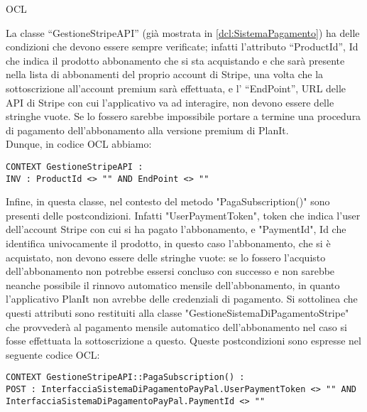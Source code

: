 \begin{listaPersonale}{OCL}
    \begin{center}
        
    \end{center}
    La classe “GestioneStripeAPI” (già mostrata in \ref{dcl:SistemaPagamento}) ha delle condizioni che devono essere sempre verificate; infatti l'attributo “ProductId”, Id che indica il prodotto abbonamento che si sta acquistando e che sarà presente nella lista di abbonamenti del proprio account di Stripe, una volta che la sottoscrizione all'account premium sarà effettuata, e l' “EndPoint”, URL delle API di Stripe con cui l'applicativo va ad interagire, non devono essere delle stringhe vuote. Se lo fossero sarebbe impossibile portare a termine una procedura di pagamento dell'abbonamento alla versione premium di PlanIt. \\
    Dunque, in codice OCL abbiamo:
    \begin{lstlisting}
CONTEXT GestioneStripeAPI :
INV : ProductId <> "" AND EndPoint <> ""
    \end{lstlisting}
    Infine, in questa classe, nel contesto del metodo "PagaSubscription()" sono presenti delle postcondizioni. Infatti "UserPaymentToken", token che indica l'user dell'account Stripe con cui si ha pagato l'abbonamento, e "PaymentId", Id che identifica univocamente il prodotto, in questo caso l'abbonamento, che si è acquistato, non devono essere delle stringhe vuote: se lo fossero l'acquisto dell'abbonamento non potrebbe essersi concluso con successo e non sarebbe neanche possibile il rinnovo automatico mensile dell'abbonamento, in quanto l'applicativo PlanIt non avrebbe delle credenziali di pagamento. Si sottolinea che questi attributi sono restituiti alla classe "GestioneSistemaDiPagamentoStripe" che provvederà al pagamento mensile automatico dell'abbonamento nel caso si fosse effettuata la sottoscrizione a questo.
    Queste postcondizioni sono espresse nel seguente codice OCL:
    \begin{lstlisting}
CONTEXT GestioneStripeAPI::PagaSubscription() :
POST : InterfacciaSistemaDiPagamentoPayPal.UserPaymentToken <> "" AND InterfacciaSistemaDiPagamentoPayPal.PaymentId <> ""
    \end{lstlisting}





\end{listaPersonale}
